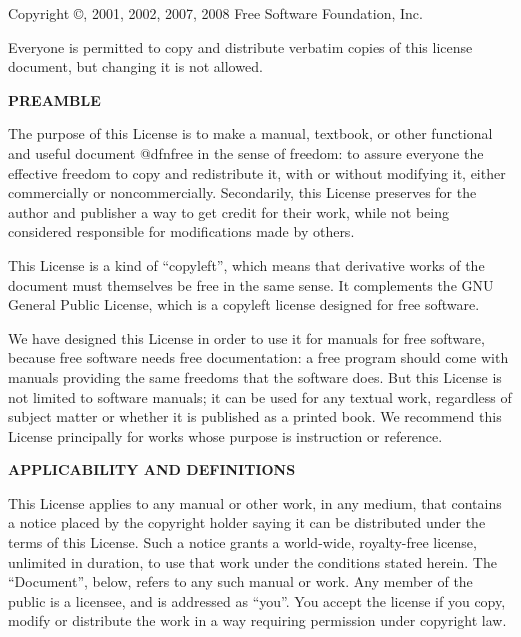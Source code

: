 
\blank

Copyright \copyright {}, 2001, 2002, 2007, 2008 Free Software Foundation, Inc. 

Everyone is permitted to copy and distribute verbatim copies of this license document, but changing it is not allowed.

\startitemize[n][start=0]
\item
{\bf PREAMBLE}

The purpose of this License is to make a manual, textbook, or other functional and useful document @dfn{free} in the sense of freedom: to assure everyone the effective freedom to copy and redistribute it, with or without modifying it, either commercially or noncommercially. Secondarily, this License preserves for the author and publisher a way to get credit for their work, while not being considered responsible for modifications made by others. 

This License is a kind of ``copyleft'', which means that derivative works of the document must themselves be free in the same sense.  It complements the GNU General Public License, which is a copyleft license designed for free software.

We have designed this License in order to use it for manuals for free software, because free software needs free documentation: a free program should come with manuals providing the same freedoms that the software does.  But this License is not limited to software manuals; it can be used for any textual work, regardless of subject matter or whether it is published as a printed book.  We recommend this License principally for works whose purpose is instruction or reference.

\item
{\bf APPLICABILITY AND DEFINITIONS}

This License applies to any manual or other work, in any medium, that contains a notice placed by the copyright holder saying it can be distributed under the terms of this License.  Such a notice grants a world-wide, royalty-free license, unlimited in duration, to use that work under the conditions stated herein.  The ``Document'', below, refers to any such manual or work.  Any member of the public is a licensee, and is addressed as ``you''.  You accept the license if you copy, modify or distribute the work in a way requiring permission under copyright law.

